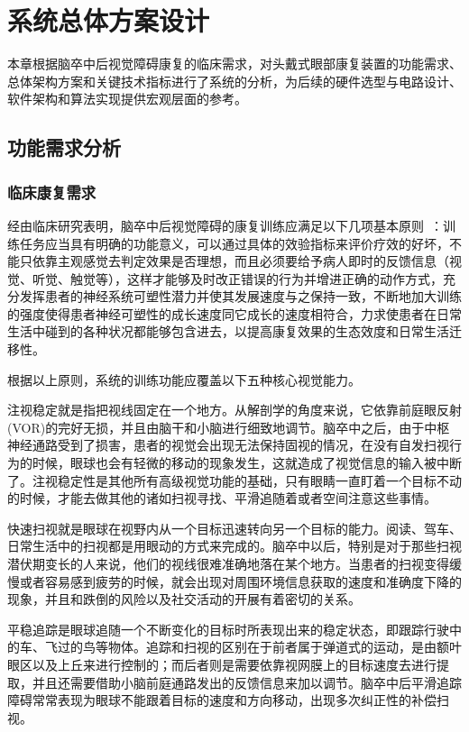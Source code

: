 \chapter{系统总体方案设计}

本章根据脑卒中后视觉障碍康复的临床需求，对头戴式眼部康复装置的功能需求、总体架构方案和关键技术指标进行了系统的分析，为后续的硬件选型与电路设计、软件架构和算法实现提供宏观层面的参考。

\section{功能需求分析}

\subsection{临床康复需求}

经由临床研究表明，脑卒中后视觉障碍的康复训练应满足以下几项基本原则~\cite{strokerehab2011}：训练任务应当具有明确的功能意义，可以通过具体的效验指标来评价疗效的好坏，不能只依靠主观感觉去判定效果是否理想，而且必须要给予病人即时的反馈信息（视觉、听觉、触觉等），这样才能够及时改正错误的行为并增进正确的动作方式，充分发挥患者的神经系统可塑性潜力并使其发展速度与之保持一致，不断地加大训练的强度使得患者神经可塑性的成长速度同它成长的速度相符合，力求使患者在日常生活中碰到的各种状况都能够包含进去，以提高康复效果的生态效度和日常生活迁移性。

根据以上原则，系统的训练功能应覆盖以下五种核心视觉能力。

注视稳定就是指把视线固定在一个地方。从解剖学的角度来说，它依靠前庭眼反射(VOR)的完好无损，并且由脑干和小脑进行细致地调节。脑卒中之后，由于中枢神经通路受到了损害，患者的视觉会出现无法保持固视的情况，在没有自发扫视行为的时候，眼球也会有轻微的移动的现象发生，这就造成了视觉信息的输入被中断了。注视稳定性是其他所有高级视觉功能的基础，只有眼睛一直盯着一个目标不动的时候，才能去做其他的诸如扫视寻找、平滑追随着或者空间注意这些事情。

快速扫视就是眼球在视野内从一个目标迅速转向另一个目标的能力。阅读、驾车、日常生活中的扫视都是用眼动的方式来完成的。脑卒中以后，特别是对于那些扫视潜伏期变长的人来说，他们的视线很难准确地落在某个地方。当患者的扫视变得缓慢或者容易感到疲劳的时候，就会出现对周围环境信息获取的速度和准确度下降的现象，并且和跌倒的风险以及社交活动的开展有着密切的关系。

平稳追踪是眼球追随一个不断变化的目标时所表现出来的稳定状态，即跟踪行驶中的车、飞过的鸟等物体。追踪和扫视的区别在于前者属于弹道式的运动，是由额叶眼区以及上丘来进行控制的；而后者则是需要依靠视网膜上的目标速度去进行提取，并且还需要借助小脑前庭通路发出的反馈信息来加以调节。脑卒中后平滑追踪障碍常常表现为眼球不能跟着目标的速度和方向移动，出现多次纠正性的补偿扫视。

